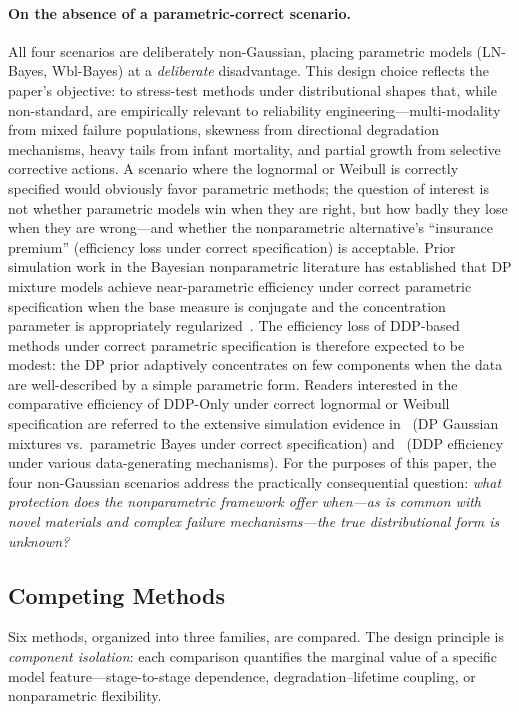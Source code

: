 \documentclass[a4paper,fleqn,longmktitle]{cas-sc}
\begin{document}
\paragraph{On the absence of a parametric-correct scenario.} All four scenarios are deliberately non-Gaussian, placing parametric models (LN-Bayes, Wbl-Bayes) at a \emph{deliberate} disadvantage. This design choice reflects the paper's objective: to stress-test methods under distributional shapes that, while non-standard, are empirically relevant to reliability engineering---multi-modality from mixed failure populations, skewness from directional degradation mechanisms, heavy tails from infant mortality, and partial growth from selective corrective actions. A scenario where the lognormal or Weibull is correctly specified would obviously favor parametric methods; the question of interest is not whether parametric models win when they are right, but how badly they lose when they are wrong---and whether the nonparametric alternative's ``insurance premium'' (efficiency loss under correct specification) is acceptable. Prior simulation work in the Bayesian nonparametric literature has established that DP mixture models achieve near-parametric efficiency under correct parametric specification when the base measure is conjugate and the concentration parameter is appropriately regularized~\cite{Ghosal2000}. The efficiency loss of DDP-based methods under correct parametric specification is therefore expected to be modest: the DP prior adaptively concentrates on few components when the data are well-described by a simple parametric form. Readers interested in the comparative efficiency of DDP-Only under correct lognormal or Weibull specification are referred to the extensive simulation evidence in~\cite{Ishwaran2001} (DP Gaussian mixtures vs.\ parametric Bayes under correct specification) and~\cite{Quintana2022} (DDP efficiency under various data-generating mechanisms). For the purposes of this paper, the four non-Gaussian scenarios address the practically consequential question: \emph{what protection does the nonparametric framework offer when---as is common with novel materials and complex failure mechanisms---the true distributional form is unknown?}

\subsection{Competing Methods}

Six methods, organized into three families, are compared. The design principle is \emph{component isolation}: each comparison quantifies the marginal value of a specific model feature---stage-to-stage dependence, degradation--lifetime coupling, or nonparametric flexibility.
\end{document}
